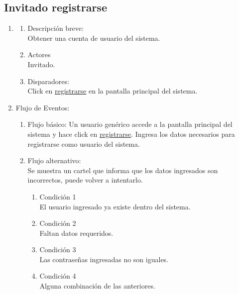 \documentclass[a4paper,11pt]{article}
\begin{document}
\subsection{Invitado registrarse}
\begin{enumerate}

    \item
        \begin{enumerate}
            \item Descripción breve: \\
                Obtener una cuenta de usuario del sistema.
            \item Actores \\
                Invitado.
            \item Disparadores: \\
                Click en \underline{registrarse} en la pantalla principal del sistema.

        \end{enumerate}

    \item Flujo de Eventos:

        \begin{enumerate}
            \item Flujo básico:
                Un usuario genérico accede a la pantalla principal del sistema y
                hace click en \underline{registrarse}. Ingresa los datos necesarios
                para registrarse como usuario del sistema.

            \item Flujo alternativo:\\
                Se muestra un cartel que informa que los datos ingresados son
                incorrectos, puede volver a intentarlo.

                \begin{enumerate}
                    \item Condición 1 \\
                            El usuario ingresado ya existe dentro del sistema.
                    \item Condición 2 \\
                            Faltan datos requeridos.
                    \item Condición 3 \\
                            Las contrase\~nas ingresadas no son iguales.
                    \item Condición 4 \\
                            Alguna combinación de las anteriores.
                \end{enumerate}
	\end{enumerate}


\end{enumerate}
\end{document}

